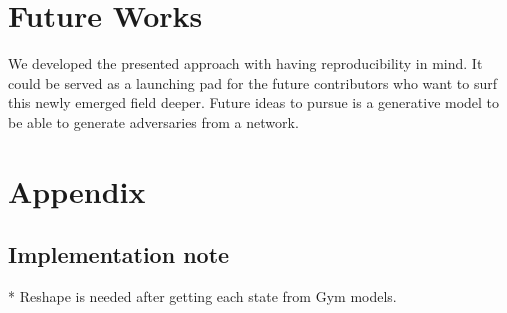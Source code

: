 \documentclass{article}
\begin{document}
    \section{Future Works}
    We developed the presented approach with having reproducibility in mind. It could be served as a launching pad for the future contributors who want to surf this newly emerged field deeper. Future ideas to pursue is a generative model to be able to generate adversaries from a network.

    \section*{Appendix}

    \subsection{Implementation note}
    * Reshape is needed after getting each state from Gym models.




    
    





\end{document}
